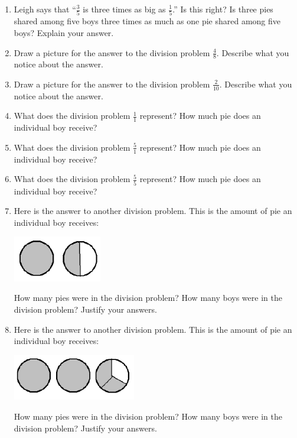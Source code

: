 \documentclass[10pt, reqno]{amsart}
\theoremstyle{remark}
\theoremstyle{definition}
\numberwithin{equation}{section}  %
\begin{document}
\begin{enumerate}
\item
Leigh says that ``$\frac 3 5$ is three times as big as $\frac 1 5$.''
Is this right? Is
three pies shared among five boys three times as much as one pie shared among
five boys? Explain your answer.\\

\item
Draw a picture for the answer to the division problem $\frac 4 8$.
Describe
what you notice about the answer.\\

\item
Draw a picture for the answer to the division problem $\frac 2 {10}$.
Describe
what you notice about the answer.\\

\item
What does the division problem $\frac 1 1$
represent? How much pie does an
individual boy receive?\\


\item
What does the division problem $\frac 5 1$
represent? How much pie does
an individual boy receive?\\

\item
What does the division problem $\frac 5 5$
represent? How much pie does
an individual boy receive?\\



\item
Here is the answer to another division problem. This is the amount
of pie an individual boy receives:
\begin{center}
\includegraphics[height = 2cm]{3halfpie}
\end{center}
How many pies were in the division problem?  How many boys were in the division problem?  Justify your answers.\\


\item
Here is the answer to another division problem. This is the amount
of pie an individual boy receives:
\begin{center}
\includegraphics[height = 2cm]{8thirdpie}
\end{center}
How many pies were in the division problem?  How many boys were in the division problem?  Justify your answers.\\




\end{enumerate}
\end{document}
